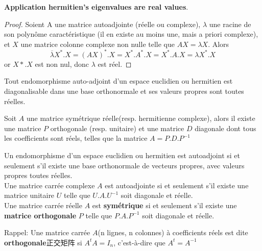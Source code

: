 \documentclass{book}
\begin{document}
\textbf{Application hermitien's eigenvalues are real values}.
\begin{proof}
Soient A une matrice autoadjointe (r\'eelle ou complexe), $\lambda$ une racine de son polyn\^ome caract\'eristique (il en existe au moins une,
mais a priori complexe), et $X$ une matrice colonne complexe non nulle telle que
$AX=\lambda X$. Alors
$$ \overline\lambda X^*.X=(AX)^*.X=X^*.A^*.X=X^*.A.X=\lambda X^*.X $$
or $X*.X$ est non nul, donc $\lambda$ est r\'eel.
\end{proof}

\begin{theorem}
Tout endomorphisme auto-adjoint d'un espace euclidien ou hermitien est diagonalisable dans une base orthonormale et ses valeurs propres sont toutes r\'eelles.
\end{theorem}

\begin{theorem}
Soit $A$ une matrice sym\'etrique r\'eelle(resp. hermitienne complexe),
alors il existe une matrice $P$ orthogonale (resp. unitaire) et une matrice $D$ diagonale dont tous les coefficients sont r\'eels,
telles que la matrice $A = P.D.P^{-1}$
\end{theorem}

\begin{theorem}
Un endomorphisme d'un espace euclidien ou hermitien est autoadjoint
si et seulement s'il existe une base orthonormale de vecteurs propres, avec valeurs propres toutes r\'eelles.\\
Une matrice carr\'ee complexe $A$ est autoadjointe si et seulement s'il existe une matrice unitaire $U$ telle que $U.A.U^{-1}$ soit diagonale et r\'eelle.\\
Une matrice carr\'ee r\'eelle $A$ est \textbf{sym\'etrique} si et seulement s'il existe une \textbf{matrice orthogonale} $P$
telle que $P.A.P^{-1}$ soit diagonale et r\'eelle.
\end{theorem}
Rappel:
Une matrice carr\'ee $A$(n lignes, n colonnes) \`a coefficients r\'eels est dite \textbf{orthogonale}正交矩阵 si $A^t A = I_n$, c'est-\`a-dire que $A^t = A^{-1}$
\end{document}

